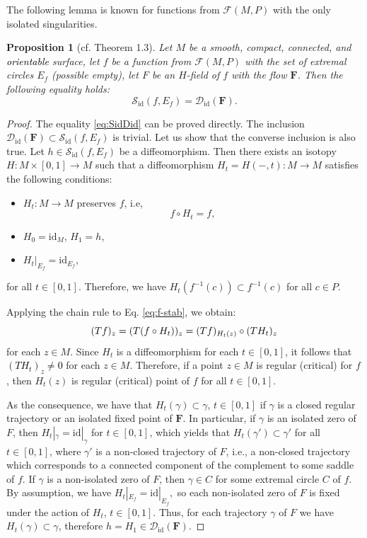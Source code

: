 \documentclass[10pt,reqno]{amsart}
\newtheorem{proposition}[subsection]{Proposition}
\newcommand{\bfF}{\mathbf{F}}
\newcommand{\F}{\mathcal{F}(M,P)}
\newcommand{\id}{\mathrm{id}}
\newcommand{\textr}[1]{\textcolor{black}{#1}}
\begin{document}
The following lemma is known for functions from $\mathcal{F}(M,P)$ with the  only isolated singularities.
\begin{proposition}[cf.  Theorem 1.3\cite{Maksymenko:AGAG:2006}]\label{prop:shift-functions-exist-global}
	Let $M$ be a smooth, compact, connected, and \textr{orientable} surface, let $f$ be a function from $\F$ with the set of extremal circles $E_f$ {\rm(}possible empty{\rm)}, let $F$ be an $H$-field of $f$ with the flow $\bfF$. Then the following equality holds:
	\begin{equation}\label{eq:SidDid}
		\mathcal{S}_{\id}(f,E_f) = \mathcal{D}_{\id}(\bfF).
	\end{equation}
\end{proposition}
\begin{proof}
The equality \eqref{eq:SidDid} can be proved directly.
The inclusion $\mathcal{D}_{\id}(\bfF)\subset \mathcal{S}_{\id}(f,E_f)$  is trivial. Let us show that the converse inclusion is also true. 
Let $h\in \mathcal{S}_{\id}(f,E_f)$ be a diffeomorphism. Then there exists an isotopy
$H:M\times [0,1]\to M$ such that a diffeomorphism $H_t = H(-,t):M\to M$ satisfies the following conditions:
\begin{itemize}
	\item $H_t:M\to M$ preserves $f$, i.e, 
	\begin{equation}\label{eq:f-stab}
		f\circ H_t = f,
	\end{equation}
	\item  $H_0 = \id_M$, $H_1 = h$,
	\item $H_t|_{E_f} = \id_{E_f}$,
\end{itemize}
for all $t\in [0,1]$.
Therefore, we have $H_t(f^{-1}(c))\subset f^{-1}(c)$ for all $c\in P$. 

Applying the chain rule to Eq. \eqref{eq:f-stab}, we obtain:
\begin{equation}\label{eq:chain-rule}
	\textr{	(Tf)_z = (T(f\circ H_t))_z = (Tf)_{H_t(z)}\circ (TH_t)_{z}}
\end{equation}	
for each $z\in M$. Since $H_t$ is a diffeomorphism for each $t\in [0,1]$, it follows that \textr{$(TH_t)_z\neq 0$} for each $z\in M$. Therefore, if a point $z\in M$ is regular (critical) for $f$, then $H_t(z)$ is regular (critical) point of $f$ for all $t\in [0,1]$. 

As the consequence,
we have that $H_t(\gamma)\subset \gamma$, $t\in [0,1]$ if $\gamma$ is a closed
regular trajectory  or an isolated fixed point of $\bfF$.  In particular, if $\gamma$ is an isolated zero of $F$, then $H_t|_{\gamma} = \id|_{\gamma}$ for $t\in [0,1]$, which yields that $H_t(\gamma')\subset \gamma'$ for all $t\in[0,1]$, where $\gamma'$ is a non-closed trajectory of $F$, i.e., a non-closed trajectory which corresponds to a connected component of the complement to some saddle of $f$.
If $\gamma$ is a non-isolated zero of $F$, then $\gamma\in C$ for some extremal circle $C$ of $f$. By assumption, we have $H_t|_{E_f} = \id|_{E_f},$ so each non-isolated zero of $F$ is fixed under the action of $H_t$, $t\in [0,1].$  Thus, for each trajectory $\gamma$ of $F$ we have $H_t(\gamma)\subset \gamma$, therefore $h = H_1\in \mathcal{D}_{\id}(\bfF).$
\end{proof}
\end{document}
